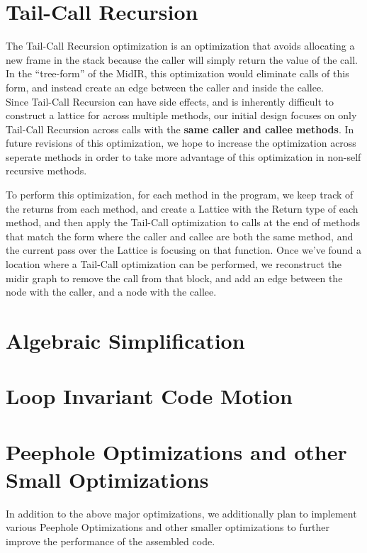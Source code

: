 \documentclass[11pt]{article}
\begin{document}
\section {Tail-Call Recursion}
\label{sec:tailcall}

The Tail-Call Recursion optimization is an optimization that avoids
allocating a new frame in the stack because the caller will simply
return the value of the call. In the ``tree-form'' of the MidIR, this
optimization would eliminate calls of this form, and instead create an
edge between the caller and inside the callee.\\

Since Tail-Call Recursion can have side effects, and is inherently
difficult to construct a lattice for across multiple methods, our
initial design focuses on only Tail-Call Recursion across calls with
the \textbf{same caller and callee methods}. In future revisions of
this optimization, we hope to increase the optimization across
seperate methods in order to take more advantage of this optimization
in non-self recursive methods.

To perform this optimization, for each method in the program, we keep
track of the returns from each method, and create a Lattice with the
Return type of each method, and then apply the Tail-Call optimization
to calls at the end of methods that match the form where the caller
and callee are both the same method, and the current pass over the
Lattice is focusing on that function. Once we've found a location
where a Tail-Call optimization can be performed, we reconstruct the
midir graph to remove the call from that block, and add an edge
between the node with the caller, and a node with the callee.


\section {Algebraic Simplification}
\label{sec:algebra}

\section {Loop Invariant Code Motion}
\label{sec:codehoist}

\section {Peephole Optimizations and other Small Optimizations}
\label{sec:peephole}
In addition to the above major optimizations, we additionally plan to
implement various Peephole Optimizations and other smaller
optimizations to further improve the performance of the assembled
code.\\
\end{document}
